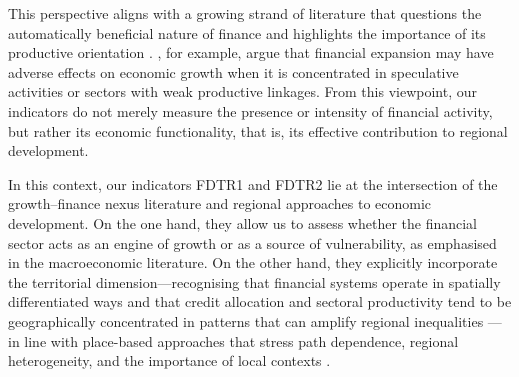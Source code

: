 \documentclass[a4paper,11pt,oneside]{article}
\begin{document}
This perspective aligns with a growing strand of literature that questions the automatically beneficial nature of finance and highlights the importance of its productive orientation \citep{philippon2015has,bazot2018financial,bazot2024deregulation}. \cite{dore2008financialization}, for example, argue that financial expansion may have adverse effects on economic growth when it is concentrated in speculative activities or sectors with weak productive linkages. From this viewpoint, our indicators do not merely measure the presence or intensity of financial activity, but rather its economic functionality, that is, its effective contribution to regional development.






In this context, our indicators FDTR1 and FDTR2 lie at the intersection of the growth–finance nexus literature and regional approaches to economic development. On the one hand, they allow us to assess whether the financial sector acts as an engine of growth or as a source of vulnerability, as emphasised in the macroeconomic literature. On the other hand, they explicitly incorporate the territorial dimension---recognising that financial systems operate in spatially differentiated ways and that credit allocation and sectoral productivity tend to be geographically concentrated in patterns that can amplify regional inequalities \citep{martin2011local,klagge2005decentralized}---in line with place-based approaches that stress path dependence, regional heterogeneity, and the importance of local contexts \citep{martin2006path,crescenzi2020one}.
\end{document}
